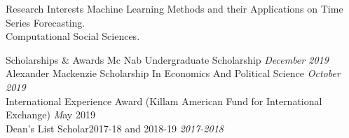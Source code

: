 \documentclass{resume} %
\begin{document}
\begin{rSection}{Research Interests}
Machine Learning Methods and their Applications on Time Series Forecasting.
\\Computational Social Sciences.
\end{rSection}


\begin{rSection}{Scholarships \& Awards}
{Mc Nab Undergraduate Scholarship} \hfill {\em December 2019} \\
{Alexander Mackenzie Scholarship In Economics And Political Science} \hfill {\em October 2019} \\
{International Experience Award (Killam American Fund for International Exchange)} \hfill{\emph May 2019} \\
{Dean's List Scholar2017-18 and 2018-19} \hfill {\em 2017-2018}
\end{rSection}
\end{document}
